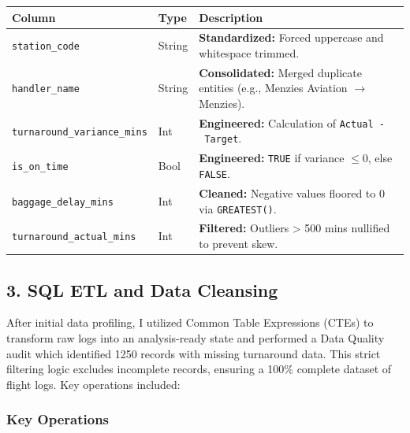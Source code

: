 \documentclass[
  letterpaper,
  DIV=11,
  numbers=noendperiod]{scrartcl}
\begin{document}
\begin{longtable}[]{@{}
  >{\raggedright\arraybackslash}p{}
  >{\raggedright\arraybackslash}p{}
  >{\raggedright\arraybackslash}p{}@{}}
\toprule\noalign{}
\begin{minipage}[b]{\linewidth}\raggedright
Column
\end{minipage} & \begin{minipage}[b]{\linewidth}\raggedright
Type
\end{minipage} & \begin{minipage}[b]{\linewidth}\raggedright
Description
\end{minipage} \\
\midrule\noalign{}
\endhead
\bottomrule\noalign{}
\endlastfoot
\texttt{station\_code} & String & \textbf{Standardized:} Forced
uppercase and whitespace trimmed. \\
\texttt{handler\_name} & String & \textbf{Consolidated:} Merged
duplicate entities (e.g., Menzies Aviation \(\rightarrow\) Menzies). \\
\texttt{turnaround\_variance\_mins} & Int & \textbf{Engineered:}
Calculation of \texttt{Actual\ -\ Target}. \\
\texttt{is\_on\_time} & Bool & \textbf{Engineered:} \texttt{TRUE} if
variance \(\le 0\), else \texttt{FALSE}. \\
\texttt{baggage\_delay\_mins} & Int & \textbf{Cleaned:} Negative values
floored to 0 via \texttt{GREATEST()}. \\
\texttt{turnaround\_actual\_mins} & Int & \textbf{Filtered:} Outliers
\textgreater{} 500 mins nullified to prevent skew. \\
\end{longtable}

\subsection{3. SQL ETL and Data
Cleansing}\label{sql-etl-and-data-cleansing}

After initial data profiling, I utilized Common Table Expressions (CTEs)
to transform raw logs into an analysis-ready state and performed a Data
Quality audit which identified 1250 records with missing turnaround
data. This strict filtering logic excludes incomplete records, ensuring
a 100\% complete dataset of flight logs. Key operations included:

\subsubsection{Key Operations}
\end{document}

